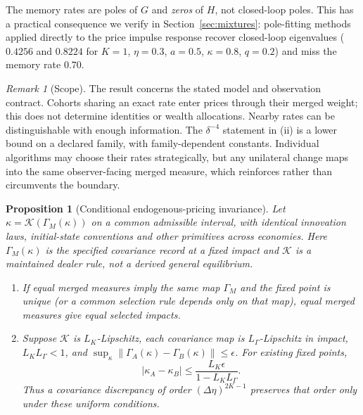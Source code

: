 \documentclass[12pt]{article}
\newtheorem{proposition}[theorem]{Proposition}
\theoremstyle{definition}
\theoremstyle{remark}
\newtheorem{remark}[theorem]{Remark}
\begin{document}
The memory rates are poles of $G$ and \emph{zeros} of $H$, not closed-loop poles. This has a practical consequence we verify in Section~\ref{sec:mixtures}: pole-fitting methods applied directly to the price impulse response recover closed-loop eigenvalues ($0.4256$ and $0.8224$ for $K=1$, $\eta=0.3$, $a=0.5$, $\kappa=0.8$, $q=0.2$) and miss the memory rate $0.70$.

\begin{remark}[Scope]\label{rem:scope}
The result concerns the stated model and observation contract. Cohorts sharing an exact rate enter prices through their merged weight; this does not determine identities or wealth allocations. Nearby rates can be distinguishable with enough information. The $\delta^{-4}$ statement in (ii) is a lower bound on a declared family, with family-dependent constants. Individual algorithms may choose their rates strategically, but any unilateral change maps into the same observer-facing merged measure, which reinforces rather than circumvents the boundary.
\end{remark}

\begin{proposition}[Conditional endogenous-pricing invariance]\label{prop:endogenous_kappa}
Let $\kappa=\mathcal K(\Gamma_M(\kappa))$ on a common admissible interval, with identical innovation laws, initial-state conventions and other primitives across economies. Here $\Gamma_M(\kappa)$ is the specified covariance record at a fixed impact and $\mathcal K$ is a maintained dealer rule, not a derived general equilibrium.
\begin{enumerate}[label=(\roman*)]
\item If equal merged measures imply the same map $\Gamma_M$ and the fixed point is unique (or a common selection rule depends only on that map), equal merged measures give equal selected impacts.
\item Suppose $\mathcal K$ is $L_K$-Lipschitz, each covariance map is $L_\Gamma$-Lipschitz in impact, $L_KL_\Gamma<1$, and $\sup_\kappa\|\Gamma_A(\kappa)-\Gamma_B(\kappa)\|\le\epsilon$. For existing fixed points,
\begin{equation}\label{eq:kappa_closeness}
 |\kappa_A-\kappa_B|\le\frac{L_K\epsilon}{1-L_KL_\Gamma}.
\end{equation}
Thus a covariance discrepancy of order $(\Delta\eta)^{2K-1}$ preserves that order only under these uniform conditions.
\end{enumerate}
\end{proposition}
\end{document}
